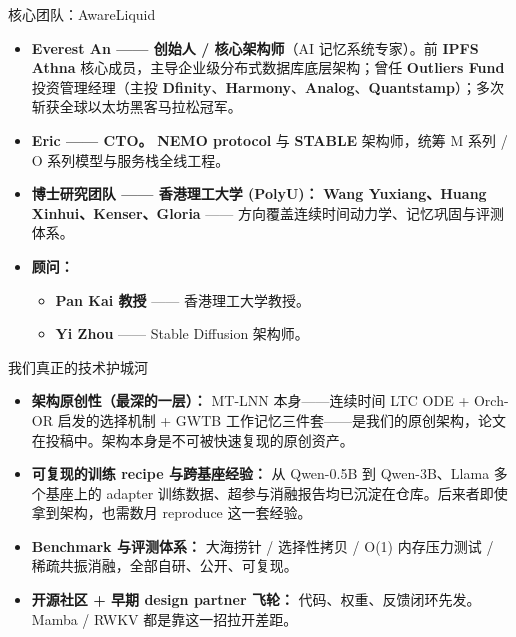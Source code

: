 ﻿\documentclass[aspectratio=169, 10pt]{beamer}
\begin{document}
\begin{frame}{核心团队：AwareLiquid}
\small
\begin{itemize}\itemsep=0.4em
    \item \textbf{Everest An —— 创始人 / 核心架构师}（AI 记忆系统专家）。前 \textbf{IPFS Athna} 核心成员，主导企业级分布式数据库底层架构；曾任 \textbf{Outliers Fund} 投资管理经理（主投 \textbf{Dfinity}、\textbf{Harmony}、\textbf{Analog}、\textbf{Quantstamp}）；多次斩获全球以太坊黑客马拉松冠军。
    \item \textbf{Eric —— CTO。} \textbf{NEMO protocol} 与 \textbf{STABLE} 架构师，统筹 M 系列 / O 系列模型与服务栈全线工程。
    \item \textbf{博士研究团队 —— 香港理工大学 (PolyU)：} \textbf{Wang Yuxiang、Huang Xinhui、Kenser、Gloria} —— 方向覆盖连续时间动力学、记忆巩固与评测体系。
    \vspace{0.3em}
    \item \textbf{顾问：}
    \begin{itemize}
        \item \textbf{Pan Kai 教授} —— 香港理工大学教授。
        \item \textbf{Yi Zhou} —— Stable Diffusion 架构师。
    \end{itemize}
\end{itemize}
\end{frame}

\begin{frame}{我们真正的技术护城河}
\small
\begin{itemize}\itemsep=0.5em
    \item \textbf{架构原创性（最深的一层）：} MT-LNN 本身——连续时间 LTC ODE + Orch-OR 启发的选择机制 + GWTB 工作记忆三件套——是我们的原创架构，论文在投稿中。架构本身是不可被快速复现的原创资产。
    \item \textbf{可复现的训练 recipe 与跨基座经验：} 从 Qwen-0.5B 到 Qwen-3B、Llama 多个基座上的 adapter 训练数据、超参与消融报告均已沉淀在仓库。后来者即使拿到架构，也需数月 reproduce 这一套经验。
    \item \textbf{Benchmark 与评测体系：} 大海捞针 / 选择性拷贝 / O(1) 内存压力测试 / 稀疏共振消融，全部自研、公开、可复现。
    \item \textbf{开源社区 + 早期 design partner 飞轮：} 代码、权重、反馈闭环先发。Mamba / RWKV 都是靠这一招拉开差距。
\end{itemize}
\end{frame}
\end{document}
